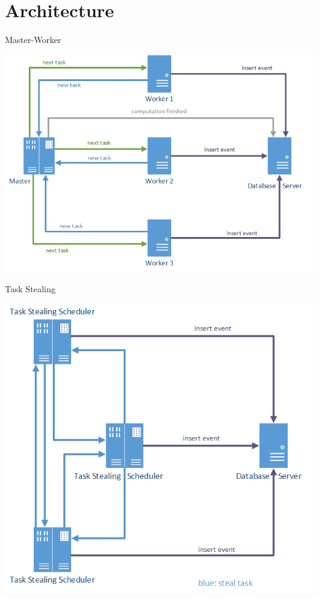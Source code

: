 \section{Architecture}

	\begin{frame}{Master-Worker}
		\centerline{\includegraphics[scale=0.5]{images/master}}
	\end{frame}
	\begin{frame}{Task Stealing}
		\centerline{\includegraphics[scale=0.5]{images/taskstealing}}
	\end{frame}

